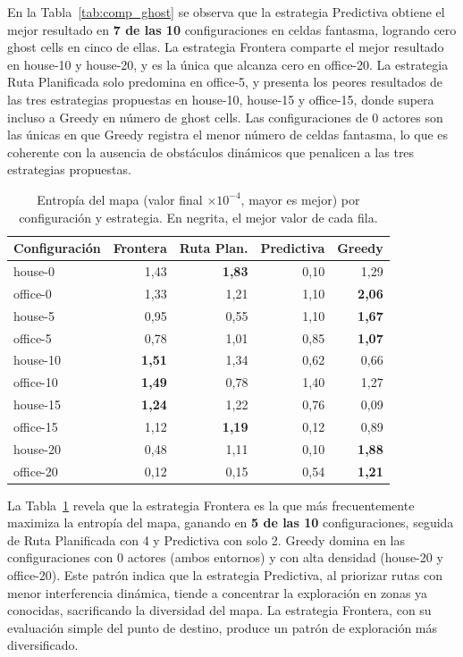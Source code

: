 En la Tabla~\ref{tab:comp_ghost} se observa que la estrategia Predictiva obtiene el mejor resultado en \textbf{7 de las 10} configuraciones en celdas fantasma, logrando cero ghost cells en cinco de ellas. La estrategia Frontera comparte el mejor resultado en house-10 y house-20, y es la única que alcanza cero en office-20. La estrategia Ruta Planificada solo predomina en office-5, y presenta los peores resultados de las tres estrategias propuestas en house-10, house-15 y office-15, donde supera incluso a Greedy en número de ghost cells. Las configuraciones de 0 actores son las únicas en que Greedy registra el menor número de celdas fantasma, lo que es coherente con la ausencia de obstáculos dinámicos que penalicen a las tres estrategias propuestas.

\begin{table}[htbp]
    \centering
    \caption{Entropía del mapa (valor final $\times 10^{-4}$, mayor es mejor) por configuración y estrategia. En negrita, el mejor valor de cada fila.}%
    \label{tab:comp_entropy}
    \begin{tabular}{lrrrr}
        \toprule
        \textbf{Configuración} & \textbf{Frontera} & \textbf{Ruta Plan.} & \textbf{Predictiva} & \textbf{Greedy} \\
        \midrule
        house-0   & 1{,}43 & \textbf{1{,}83} & 0{,}10 & 1{,}29 \\
        office-0  & 1{,}33 & 1{,}21 & 1{,}10 & \textbf{2{,}06} \\
        house-5   & 0{,}95 & 0{,}55 & 1{,}10 & \textbf{1{,}67} \\
        office-5  & 0{,}78 & 1{,}01 & 0{,}85 & \textbf{1{,}07} \\
        house-10  & \textbf{1{,}51} & 1{,}34 & 0{,}62 & 0{,}66 \\
        office-10 & \textbf{1{,}49} & 0{,}78 & 1{,}40 & 1{,}27 \\
        house-15  & \textbf{1{,}24} & 1{,}22 & 0{,}76 & 0{,}09 \\
        office-15 & 1{,}12 & \textbf{1{,}19} & 0{,}12 & 0{,}89 \\
        house-20  & 0{,}48 & 1{,}11 & 0{,}10 & \textbf{1{,}88} \\
        office-20 & 0{,}12 & 0{,}15 & 0{,}54 & \textbf{1{,}21} \\
        \bottomrule
    \end{tabular}
\end{table}

La Tabla~\ref{tab:comp_entropy} revela que la estrategia Frontera es la que más frecuentemente maximiza la entropía del mapa, ganando en \textbf{5 de las 10} configuraciones, seguida de Ruta Planificada con 4 y Predictiva con solo 2. Greedy domina en las configuraciones con 0 actores (ambos entornos) y con alta densidad (house-20 y office-20). Este patrón indica que la estrategia Predictiva, al priorizar rutas con menor interferencia dinámica, tiende a concentrar la exploración en zonas ya conocidas, sacrificando la diversidad del mapa. La estrategia Frontera, con su evaluación simple del punto de destino, produce un patrón de exploración más diversificado.

